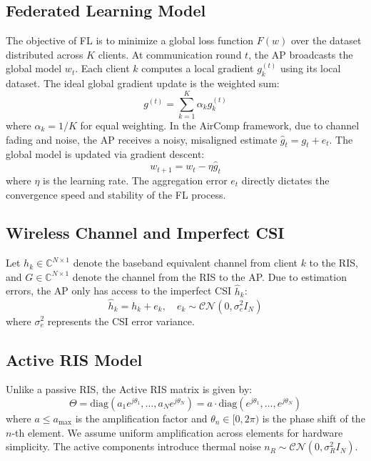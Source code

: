 \documentclass[lettersize,journal]{IEEEtran}
\begin{document}
\subsection{Federated Learning Model}
The objective of FL is to minimize a global loss function $F(w)$ over the dataset distributed across $K$ clients. At communication round $t$, the AP broadcasts the global model $w_t$. Each client $k$ computes a local gradient $g_k^{(t)}$ using its local dataset. The ideal global gradient update is the weighted sum:
\begin{equation}
g^{(t)} = \sum_{k=1}^K \alpha_k g_k^{(t)}
\end{equation}
where $\alpha_k = 1/K$ for equal weighting. In the AirComp framework, due to channel fading and noise, the AP receives a noisy, misaligned estimate $\hat{g}_t = g_t + e_t$. The global model is updated via gradient descent:
\begin{equation}
w_{t+1} = w_t - \eta \hat{g}_t
\end{equation}
where $\eta$ is the learning rate. The aggregation error $e_t$ directly dictates the convergence speed and stability of the FL process.

\subsection{Wireless Channel and Imperfect CSI}
Let $h_k \in \mathbb{C}^{N \times 1}$ denote the baseband equivalent channel from client $k$ to the RIS, and $G \in \mathbb{C}^{N \times 1}$ denote the channel from the RIS to the AP. Due to estimation errors, the AP only has access to the imperfect CSI $\hat{h}_k$:
\begin{equation}
\hat{h}_k = h_k + e_k, \quad e_k \sim \mathcal{CN}(0, \sigma_e^2 I_N)
\end{equation}
where $\sigma_e^2$ represents the CSI error variance.

\subsection{Active RIS Model}
Unlike a passive RIS, the Active RIS matrix is given by:
\begin{equation}
\Theta = \text{diag}(a_1 e^{j\theta_1}, \dots, a_N e^{j\theta_N}) = a \cdot \text{diag}(e^{j\theta_1}, \dots, e^{j\theta_N})
\end{equation}
where $a \le a_{\max}$ is the amplification factor and $\theta_n \in [0, 2\pi)$ is the phase shift of the $n$-th element. We assume uniform amplification across elements for hardware simplicity. The active components introduce thermal noise $n_R \sim \mathcal{CN}(0, \sigma_R^2 I_N)$.
\end{document}
